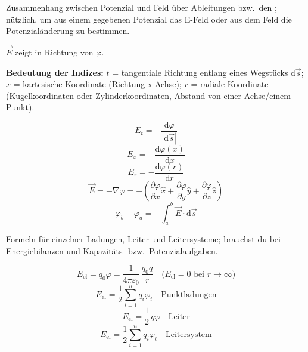 \begin{runintext}
Zusammenhang zwischen Potenzial und Feld über Ableitungen bzw.\ den ; nützlich, um aus einem gegebenen Potenzial das E-Feld oder aus dem Feld die Potenzialänderung zu bestimmen.
\end{runintext}
\begin{runintext}
$\vec{E}$ zeigt in Richtung  von $\varphi$.
\end{runintext}
\begin{runintext}
\textbf{Bedeutung der Indizes:} $t$ = tangentiale Richtung entlang eines Wegstücks $\mathrm{d}\vec{s}$; $x$ = kartesische Koordinate (Richtung x-Achse); $r$ = radiale Koordinate (Kugelkoordinaten oder Zylinderkoordinaten, Abstand von einer Achse/einem Punkt).
\end{runintext}
\begin{formulabox}
\[ E_t = -\frac{\mathrm{d}\varphi}{|\mathrm{d}\vec{s}|} \]
\[ E_x = -\frac{\mathrm{d}\varphi(x)}{\mathrm{d}x} \]
\[ E_r = -\frac{\mathrm{d}\varphi(r)}{\mathrm{d}r} \]
\formulasep
\[ \vec{E} = -\nabla\varphi = -\left(\frac{\partial\varphi}{\partial x}\hat{x} + \frac{\partial\varphi}{\partial y}\hat{y} + \frac{\partial\varphi}{\partial z}\hat{z}\right) \]
\formulasep
\[ \varphi_b - \varphi_a = -\int_a^b \vec{E}\cdot\mathrm{d}\vec{s} \]
\end{formulabox}

\begin{runintext}
Formeln für  einzelner Ladungen, Leiter und Leitersysteme; brauchst du bei Energiebilanzen und Kapazitäts- bzw.\ Potenzialaufgaben.
\end{runintext}
\begin{formulabox}
\[ E_{\mathrm{el}} = q_0\varphi = \frac{1}{4\pi\varepsilon_0}\,\frac{q_0 q}{r} \quad \text{($E_{\mathrm{el}}=0$ bei $r\to\infty$)} \]
\formulasep
\[ E_{\mathrm{el}} = \frac{1}{2}\sum_{i=1}^n q_i\varphi_i \quad \text{Punktladungen} \]
\[ E_{\mathrm{el}} = \frac{1}{2}\,q\varphi \quad \text{Leiter} \]
\[ E_{\mathrm{el}} = \frac{1}{2}\sum_{i=1}^n q_i\varphi_i \quad \text{Leitersystem} \]
\end{formulabox}

